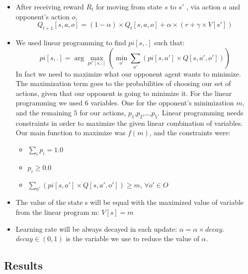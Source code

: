\documentclass[a4paper,11pt]{article}
\begin{document}
\begin{itemize}
\item After receiving reward $R_t$ for moving from state $s$ to $s'$ , via action $a$ and opponent's action $o$,
\[
Q_{t+1}[s,a,o] = (1-\alpha)\times Q_t[s,a,o] + \alpha \times (r + \gamma \times V[s'])
\]

\item We used linear programming to find $pi[s,.]$ such that:
\[
pi[s,.] = \arg\max_{pi'[s,.]} {(\min_{o'} \sum_{a'} (pi[s,a'] \times Q[s,a',o']))}
\]
In fact we need to maximize what our opponent agent wants to minimize. The maximization term goes to the probabilities of choosing our set of actions, given that our opponent is going to minimize it. For the linear programming we used $6$ variables. One for the opponent's minimization $m$, and the remaining $5$ for our actions, $p_1$,$p_2$,\ldots,$p_5$. Linear programming needs constraints in order to maximize the given linear combination of variables. Our main function to maximize was $f(m)$, and the constraints were:
\begin{itemize}
\item $ \sum_{i}{p_i} = 1.0$
\item $ p_i \geq 0.0$
\item $ \sum_{a'} (pi[s,a'] \times Q[s,a',o']) \geq m$, $\forall o' \in O$
\end{itemize}
\item The value of the state s will be equal with the maximized value of variable from the linear program m: $V[s] = m$
\item Learning rate will be always decayed in each update: $\alpha = \alpha \times decay$. $decay \in (0,1)$ is the variable we use to reduce the value of $\alpha$.
\end{itemize}


\subsection{Results}
\end{document}
